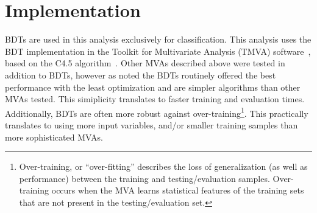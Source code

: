 


\section{Implementation}
BDTs are used in this analysis exclusively for classification.
This analysis uses the BDT implementation in the Toolkit for Multivariate Analysis (TMVA) software~\cite{tmva}, based on the
C4.5 algorithm~\cite{C4.5}. Other MVAs described above were tested in addition to BDTs, however as noted the BDTs routinely offered the
best performance with the least optimization and are simpler algorithms than other MVAs tested.
This simiplicity translates to faster training and evaluation times.
Additionally, BDTs are often more robust against over-training\footnote{Over-training, or ``over-fitting'' describes the loss of generalization (as well as performance)
between the training and testing/evaluation samples. Over-training occurs when the MVA learns statistical features of the training sets that are not present in
the testing/evaluation set.}. This practically translates to using more input variables, and/or smaller training samples than more sophisticated MVAs.

